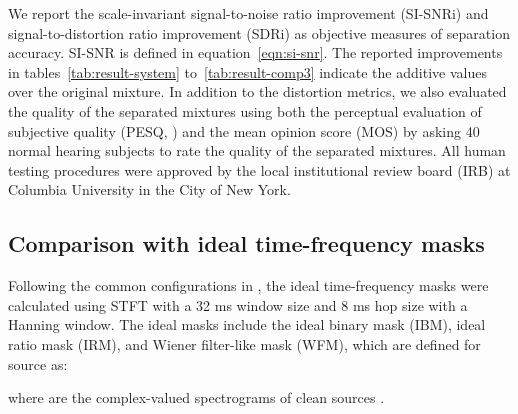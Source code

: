 \documentclass[journal]{IEEEtran}
\begin{document}
We report the scale-invariant signal-to-noise ratio improvement (SI-SNRi) and signal-to-distortion ratio improvement (SDRi) \cite{vincent2006performance} as objective measures of separation accuracy. SI-SNR is defined in equation~\ref{eqn:si-snr}. The reported improvements in tables~\ref{tab:result-system} to~\ref{tab:result-comp3} indicate the additive values over the original mixture. In addition to the distortion metrics, we also evaluated the quality of the separated mixtures using both the perceptual evaluation of subjective quality (PESQ, \cite{rix2001perceptual}) and the mean opinion score (MOS) \cite{MOS} by asking 40 normal hearing subjects to rate the quality of the separated mixtures. All human testing procedures were approved by the local institutional review board (IRB) at Columbia University in the City of New York. 

\subsection {Comparison with ideal time-frequency masks}

Following the common configurations in \cite{isik2016single, luo2017speaker, kolbaek2017multitalker}, the ideal time-frequency masks were calculated using STFT with a 32 ms window size and 8 ms hop size with a Hanning window. The ideal masks include the ideal binary mask (IBM), ideal ratio mask (IRM), and Wiener filter-like mask (WFM), which are defined for source  as:


where  are the complex-valued spectrograms of clean sources .
 
\end{document}
